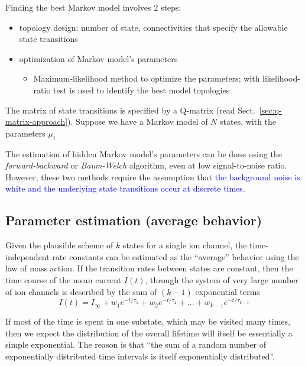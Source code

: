 Finding the best Markov model involves 2 steps:
\begin{itemize}
\item topology design: number of state, connectivities that specify
  the allowable state transitions
\item optimization of Markov model's parameters
  \begin{itemize}
  \item Maximum-likelihood method to optimize the parameters; with
    likelihood-ratio test is used to identify the best model
    topologies~\citep{magleby1990ekp, colquhoun1995fsa}
  \end{itemize}
\end{itemize}
The matrix of state transitions is specified by a Q-matrix (read
Sect.~\ref{sec:q-matrix-approach}). Suppose we have a Markov model of
$N$ states, with the parameters $\mu_i$

The estimation of hidden Markov model's parameters can be done using
the {\it forward-backward} or {\it Baum-Welch} algorithm, even at low
signal-to-noise ratio. However, these two methods require the
assumption that
\textcolor{blue}{the background noise is white and the underlying
  state transitions occur at discrete times}.










\subsection{Parameter estimation (average behavior)}
\label{sec:param-estim-aver}

Given the plausible scheme of $k$ states for a single ion channel, the
time-independent rate constants can be estimated as the ``average''
behavior using the law of mass action.  If the transition rates
between states are constant, then the time course of the mean current
$I(t)$, through the system of very large number of ion channels is
described by the sum of $(k-1)$ exponential terms
\begin{equation}
  \label{eq:836}
  I(t) = I_\infty + w_1 e^{-t/\tau_1} + w_2 e^{-t/\tau_2} + ... + w_{k-1} e^{-t/\tau_{k-1}}
\end{equation}

\begin{framed}
  If most of the time is spent in one substate, which may be visited
  many times, then we expect the distribution of the overall lifetime
  will itself be essentially a simple exponential. The reason is that
  ``the sum of a random number of exponentially distributed time
  intervals is itself exponentially distributed''.
\end{framed}

